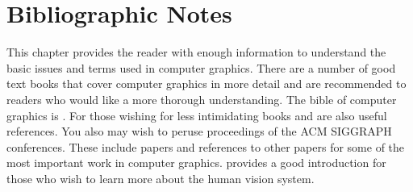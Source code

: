 \section{Bibliographic Notes}
\label{Ch03BibNotes}

This chapter provides the reader with enough information to understand the basic issues and terms used in computer graphics. There are a number of good text books that cover computer graphics in more detail and are recommended to readers who would like a more thorough understanding. The bible of computer graphics is \cite{FoleyVanDam90}. For those wishing for less intimidating books \cite{BurgerGillies89} and \cite{Watt93} are also useful references. You also may wish to peruse proceedings of the ACM SIGGRAPH conferences. These include papers and references to other papers for some of the most important work in computer graphics. \cite{Carlson85} provides a good introduction for those who wish to learn more about the human vision system.


\printbibliography



